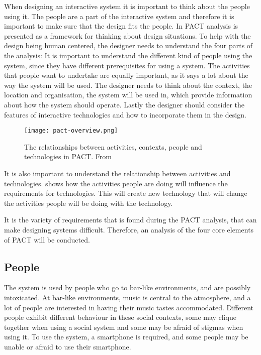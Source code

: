 When designing an interactive system it is important to think about the people using it. The people are a part of the interactive system and therefore it is important to make sure that the design fits the people. In \cite{benyon2013designing} PACT analysis is presented as a framework for thinking about design situations. To help with the design being human centered, the designer needs to understand the four parts of the analysis: It is important to understand the different kind of people using the system, since they have different prerequisites for using a system. The activities that people want to undertake are equally important, as it says a lot about the way the system will be used. The designer needs to think about the context, the location and organisation, the system will be used in, which provide information about how the system should operate. Lastly the designer should consider the features of interactive technologies and how to incorporate them in the design.

\begin{figure}
  \centering
  \texttt{[image: pact-overview.png]}
  \caption{The relationships between activities, contexts, people and technologies in PACT. From \cite{benyon2013designing}}
  \label{fig:pact-overview}
\end{figure}

It is also important to understand the relationship between activities and technologies.  shows how the activities people are doing will influence the requirements for technologies. This will create new technology that will change the activities people will be doing with the technology.

It is the variety of requirements that is found during the PACT analysis, that can make designing systems difficult. Therefore, an analysis of the four core elements of PACT will be conducted.


\subsection{People}
\label{sub:pact_people}

The system is used by people who go to bar-like environments, and are possibly intoxicated. At bar-like environments, music is central to the atmosphere, and a lot of people are interested in having their music tastes accommodated. Different people exhibit different behaviour in these social contexts, some may clique together when using a social system and some may be afraid of stigmas when using it. To use the system, a smartphone is required, and some people may be unable or afraid to use their smartphone.

